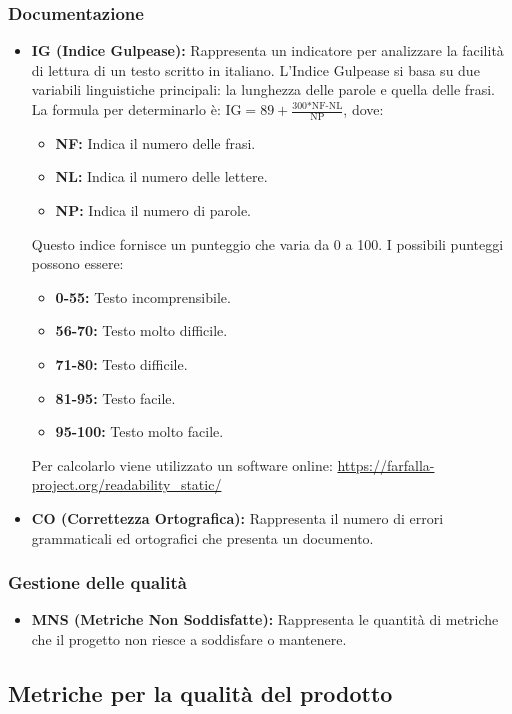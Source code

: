 \subsubsection{Documentazione}
\begin{itemize}
    \item \textbf{IG (Indice Gulpease):} Rappresenta un indicatore per analizzare la facilità di lettura di un testo scritto in italiano. L’Indice Gulpease si basa su due variabili linguistiche principali: la lunghezza delle parole e quella delle frasi. \\
    La formula per determinarlo è: \( \text{IG} = 89+\frac{\text{300*NF-NL}}{\text{NP}} \), dove:
    \begin{itemize}
        \item \textbf{NF:} Indica il numero delle frasi.
        \item \textbf{NL:} Indica il numero delle lettere.
        \item \textbf{NP:} Indica il numero di parole.
    \end{itemize}
    Questo indice fornisce un punteggio che varia da 0 a 100. I possibili punteggi possono essere:
    \begin{itemize}
        \item \textbf{0-55:} Testo incomprensibile.
        \item \textbf{56-70:} Testo molto difficile.
        \item \textbf{71-80:} Testo difficile.
        \item \textbf{81-95:} Testo facile.
        \item \textbf{95-100:} Testo molto facile.
    \end{itemize}
    Per calcolarlo viene utilizzato un software online: \url{https://farfalla-project.org/readability_static/}
    \item \textbf{CO (Correttezza Ortografica):} Rappresenta il numero di errori grammaticali ed ortografici che presenta un documento.
\end{itemize}
\subsubsection{Gestione delle qualità}
\begin{itemize}
    \item \textbf{MNS (Metriche Non Soddisfatte):} Rappresenta le quantità di metriche che il progetto non riesce a soddisfare o mantenere.
\end{itemize}
\newpage
\subsection{Metriche per la qualità del prodotto}
